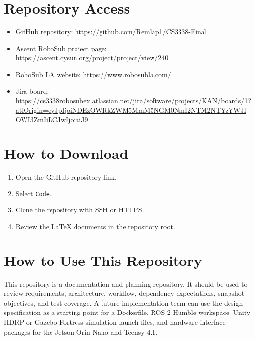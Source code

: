 \documentclass[12pt]{article}
\begin{document}
\section{Repository Access}
\begin{itemize}[leftmargin=*]
  \item GitHub repository: \url{https://github.com/Remlap1/CS3338-Final}
  \item Ascent RoboSub project page: \url{https://ascent.cysun.org/project/project/view/240}
  \item RoboSub LA website: \url{https://www.robosubla.com/}
  \item Jira board: \url{https://cs3338robosubex.atlassian.net/jira/software/projects/KAN/boards/1?atlOrigin=eyJpIjoiNDEzOWRkZWM5MmM5NGM0NmI2NTM2NTYzYWJlOWI3ZmIiLCJwIjoiaiJ9}
\end{itemize}

\section{How to Download}
\begin{enumerate}[leftmargin=*]
  \item Open the GitHub repository link.
  \item Select \texttt{Code}.
  \item Clone the repository with SSH or HTTPS.
  \item Review the LaTeX documents in the repository root.
\end{enumerate}

\section{How to Use This Repository}
This repository is a documentation and planning repository. It should be used to review requirements, architecture, workflow, dependency expectations, snapshot objectives, and test coverage. A future implementation team can use the design specification as a starting point for a Dockerfile, ROS 2 Humble workspace, Unity HDRP or Gazebo Fortress simulation launch files, and hardware interface packages for the Jetson Orin Nano and Teensy 4.1.
\end{document}
